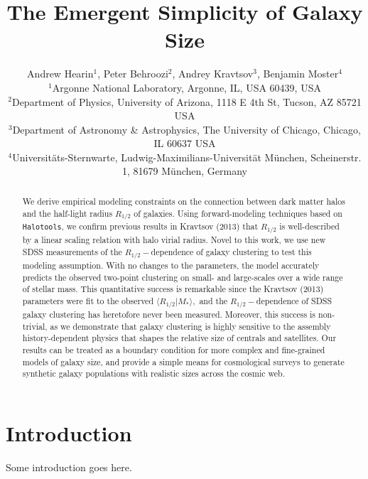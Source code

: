 \documentclass[usenatbib,usegraphicx,letterpaper]{mn2e}
\newcommand{\rhalf}{R_{1/2}}
\newcommand{\mstar}{M_{\ast}}
\begin{document}
\title[The Emergent Simplicity of Galaxy Size]
{The Emergent Simplicity of Galaxy Size}


\author[Hearin, Behroozi, Kravtsov \& Moster]{
Andrew Hearin$^{1}$, Peter Behroozi$^{2}$, Andrey Kravtsov$^{3}$, Benjamin Moster$^{4}$\\
$^{1}$Argonne National Laboratory, Argonne, IL, USA 60439, USA\\
$^{2}$Department of Physics, University of Arizona, 1118 E 4th St, Tucson, AZ 85721 USA\\
$^{3}$Department of Astronomy \& Astrophysics, The University of Chicago, Chicago, IL 60637 USA\\
$^{4}$Universit{\"a}ts-Sternwarte, Ludwig-Maximilians-Universit{\"a}t M{\"u}nchen, Scheinerstr. 1, 81679 M{\"u}nchen, Germany
}

\maketitle

\begin{abstract}
We derive empirical modeling constraints on the connection between dark matter halos and the half-light radius $\rhalf$ of galaxies. Using forward-modeling techniques based on {\tt Halotools}, we confirm previous results in Kravtsov (2013) that $\rhalf$ is well-described by a linear scaling relation with halo virial radius. Novel to this work, we use new SDSS measurements of the $\rhalf-$dependence of galaxy clustering to test this modeling assumption. With no changes to the parameters, the model accurately predicts the observed two-point clustering on small- and large-scales over a wide range of stellar mass. This quantitative success is remarkable since the Kravtsov (2013) parameters were fit to the observed $\langle\rhalf\vert\mstar\rangle,$ and the $\rhalf-$dependence of SDSS galaxy clustering has heretofore never been measured. Moreover, this success is non-trivial, as we demonstrate that galaxy clustering is highly sensitive to the assembly history-dependent physics that shapes the relative size of centrals and satellites. Our results can be treated as a boundary condition for more complex and fine-grained models of galaxy size, and provide a simple means for cosmological surveys to generate synthetic galaxy populations with realistic sizes across the cosmic web. 
\end{abstract}

\section{Introduction}
\label{sec:intro}
Some introduction goes here.
\end{document}
